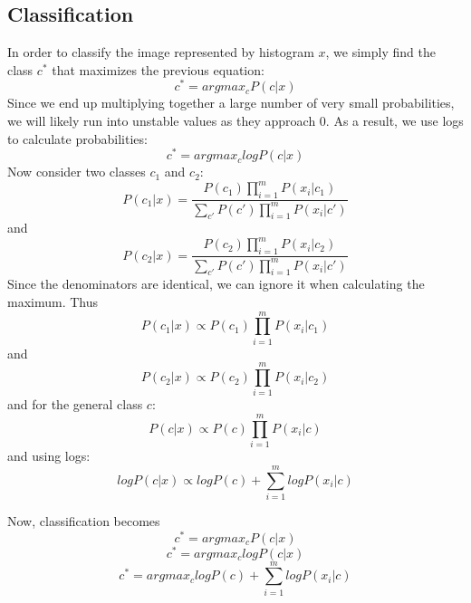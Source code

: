 \documentclass{article}
\begin{document}
\subsection{Classification}
In order to classify the image represented by histogram $x$, we simply find the class $c^*$ that maximizes the previous equation:
$$c^*=arg{max}_{c}P(c|x)$$
Since we end up multiplying together a large number of very small probabilities, we will likely run into unstable values as they approach 0. As a result, we use logs to calculate probabilities:
$$c^*=arg{max}_{c}logP(c|x)$$
Now consider two classes $c_1$ and $c_2$:
$$P(c_1|x) = \frac{P(c_1)\prod_{i=1}^mP(x_i|c_1)}{\sum_{c'}P(c')\prod_{i=1}^mP(x_i|c')}$$
and
$$P(c_2|x) = \frac{P(c_2)\prod_{i=1}^mP(x_i|c_2)}{\sum_{c'}P(c')\prod_{i=1}^mP(x_i|c')}$$
Since the denominators are identical, we can ignore it when calculating the maximum. Thus
$$P(c_1|x) \propto P(c_1)\prod_{i=1}^mP(x_i|c_1)$$
and
$$P(c_2|x) \propto P(c_2)\prod_{i=1}^mP(x_i|c_2)$$
and for the general class $c$:
$$P(c|x) \propto P(c)\prod_{i=1}^mP(x_i|c)$$
and using logs:
$$logP(c|x) \propto logP(c)+\sum_{i=1}^mlogP(x_i|c)$$

Now, classification becomes 
$$c^*=arg{max}_{c}P(c|x)$$
$$c^*=arg{max}_{c}logP(c|x)$$
$$c^*=arg{max}_{c}logP(c)+\sum_{i=1}^mlogP(x_i|c)$$

{\small


}
\end{document}

